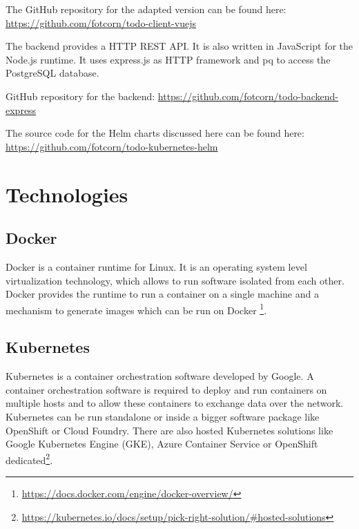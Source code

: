 The GitHub repository for the adapted version can be found here:
\url{https://github.com/fotcorn/todo-client-vuejs}

The backend provides a HTTP REST API. It is also written in JavaScript
for the Node.js runtime. It uses express.js as HTTP framework and pq to
access the PostgreSQL database.

GitHub repository for the backend:
\url{https://github.com/fotcorn/todo-backend-express}

The source code for the Helm charts discussed here can be found here:
\url{https://github.com/fotcorn/todo-kubernetes-helm}

\section{Technologies}\label{technologies}

\subsection{Docker}\label{docker}

Docker is a container runtime for Linux. It is an operating system level
virtualization technology, which allows to run software isolated from
each other. Docker provides the runtime to run a container on a single
machine and a mechanism to generate images which can be run on Docker
\footnote{\url{https://docs.docker.com/engine/docker-overview/}}.

\subsection{Kubernetes}\label{kubernetes}

Kubernetes is a container orchestration software developed by Google. A
container orchestration software is required to deploy and run
containers on multiple hosts and to allow these containers to exchange
data over the network. Kubernetes can be run standalone or inside a
bigger software package like OpenShift or Cloud Foundry. There are also
hosted Kubernetes solutions like Google Kubernetes Engine (GKE), Azure
Container Service or OpenShift dedicated\footnote{\url{https://kubernetes.io/docs/setup/pick-right-solution/\#hosted-solutions}}.


